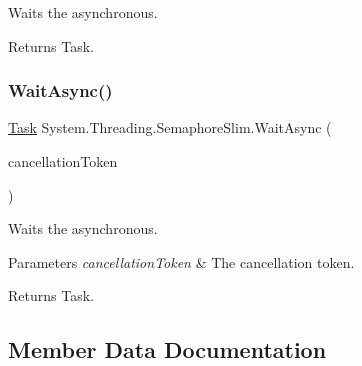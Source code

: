 Waits the asynchronous. 

\begin{DoxyReturn}{Returns}
Task.
\end{DoxyReturn}
\mbox{\label{class_system_1_1_threading_1_1_semaphore_slim_ad029e67589b38d997fea0b301c26ac11}} 
\subsubsection{\texorpdfstring{Wait\+Async()}{WaitAsync()}\hspace{0.1cm}{\footnotesize\ttfamily [2/2]}}
{\footnotesize\ttfamily \hyperlink{class_system_1_1_threading_1_1_tasks_1_1_task}{Task} System.\+Threading.\+Semaphore\+Slim.\+Wait\+Async (\begin{DoxyParamCaption}\item[{\hyperlink{struct_system_1_1_threading_1_1_cancellation_token}{Cancellation\+Token}}]{cancellation\+Token }\end{DoxyParamCaption})\hspace{0.3cm}{\ttfamily [inline]}}



Waits the asynchronous. 


\begin{DoxyParams}{Parameters}
{\em cancellation\+Token} & The cancellation token.\\
\hline
\end{DoxyParams}
\begin{DoxyReturn}{Returns}
Task.
\end{DoxyReturn}


\subsection{Member Data Documentation}
\mbox{\label{class_system_1_1_threading_1_1_semaphore_slim_a508beacf8ec7d0e5fc983a0aca4dacdb}} 
